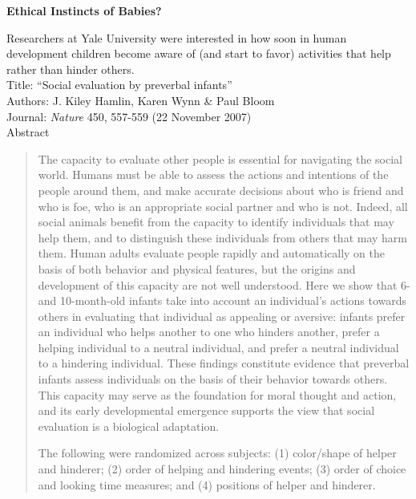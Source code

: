 \def\theTopic{Reading 3}

\begin{center}
{\bf {\large Ethical Instincts of Babies?}}
\end{center}

Researchers at Yale University were interested in how soon in human
development children become aware of (and start to favor) activities
that help rather than hinder others.\\
Title: ``Social evaluation by preverbal infants''
\\
Authors: J. Kiley Hamlin, Karen Wynn \& Paul Bloom
\\
Journal: {\it Nature} 450, 557-559 (22 November 2007) 
\\
Abstract \vspace{-.5cm}
\begin{quotation}
  The capacity to evaluate other people is essential for navigating the
social world. Humans must be able to assess the actions and intentions
of the people around them, and make accurate decisions about who is
friend and who is foe, who is an appropriate social partner and who is
not. Indeed, all social animals benefit from the capacity to identify
individuals  that may help them, and to distinguish these
individuals from others that may harm them. Human adults evaluate
people rapidly and automatically on the basis of both behavior and
physical features, but the origins and
development of this capacity are not well understood. Here we show
that 6- and 10-month-old infants take into account an individual's
actions towards others in evaluating that individual as appealing or
aversive: infants prefer an individual who helps another to one who
hinders another, prefer a helping individual to a neutral individual,
and prefer a neutral individual to a hindering individual. These
findings constitute evidence that preverbal infants assess individuals
on the basis of their behavior towards others. This capacity may
serve as the foundation for moral thought and action, and its early
developmental emergence supports the view that social evaluation is a
biological adaptation. 



The following were randomized across subjects:
(1) color/shape of helper and hinderer; (2) order of helping and
hindering events; (3) order of choice and looking time
measures; and (4) positions of helper and hinderer. 
\end{quotation}

